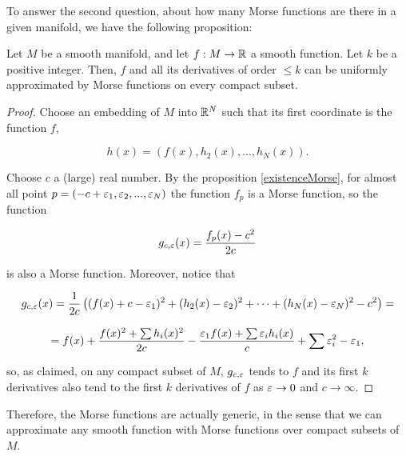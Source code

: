 To answer the second question, about how many Morse functions are there in a given manifold, we have the following proposition:

\begin{prop}
Let $M$ be a smooth manifold, and let $f : M \rightarrow \mathbb{R}$ a smooth function. Let $k$ be a positive integer. Then, $f$ and all its derivatives of order $\leq k$ can be uniformly approximated by Morse functions on every compact subset.
\end{prop}

\begin{proof}
Choose an embedding of $M$ into $\mathbb{R}^N$ such that its first coordinate is the function $f$,

\begin{displaymath}
h(x) = (f(x),h_2(x),...,h_N(x)) .
\end{displaymath}

Choose $c$ a (large) real number. By the proposition \ref{existenceMorse}, for almost all point $p = (-c+\varepsilon_1,\varepsilon_2,...,\varepsilon_N)$ the function $f_p$ is a Morse function, so the function

$$g_{c,\varepsilon}(x) = \frac{f_p(x)-c^2}{2c}$$

is also a Morse function. Moreover, notice that

$$g_{c,\varepsilon}(x) = \frac1{2c} \left((f(x) + c - \varepsilon_1)^2 + (h_2(x)-\varepsilon_2)^2 + \cdots + (h_N(x)-\varepsilon_N)^2 - c^2 \right) =$$

$$= f(x) + \frac{f(x)^2 + \sum h_i(x)^2}{2c} - \frac{\varepsilon_1f(x) + \sum \varepsilon_ih_i(x)}{c} + \sum \varepsilon_i^2 - \varepsilon_1 ,$$

so, as claimed, on any compact subset of $M$, $g_{c,\varepsilon}$ tends to $f$ and its first $k$ derivatives also tend to the first $k$ derivatives of $f$ as $\varepsilon \rightarrow 0$ and $c \rightarrow \infty$.
\end{proof}

Therefore, the Morse functions are actually generic, in the sense that we can approximate any smooth function with Morse functions over compact subsets of $M$.
